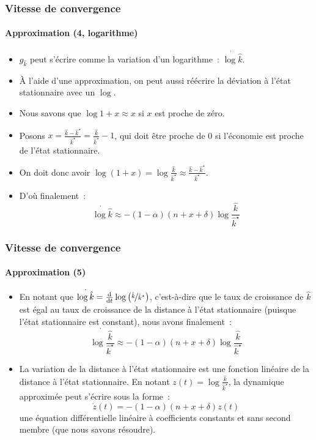 \documentclass[10pt,notheorems]{beamer}
\theoremstyle{plain}
\theoremstyle{definition} %
\begin{document}
\begin{frame}
  \frametitle{Vitesse de convergence}
  \framesubtitle{Approximation (4, logarithme)}

  \begin{itemize}

  \item $g_{\hat k}$ peut s'écrire comme la variation d'un logarithme~: $\dot{\log\hat k}$.\newline

  \item À l'aide d'une approximation, on peut aussi réécrire la déviation à l'état stationnaire avec un $\log$.\newline

  \item Nous savons que $\log 1+x \approx x$ si $x$ est proche de zéro.\newline

  \item Posons $x = \frac{\hat k - \hat k^{\star}}{\hat k^{\star}} = \frac{\hat k }{\hat k^{\star}}-1$, qui doit être proche de 0 si l'économie est proche de l'état stationnaire.\newline

  \item On doit donc avoir $\log(1+x) = \log \frac{\hat k }{\hat k^{\star}} \approx \frac{\hat k - \hat k^{\star}}{\hat k^\star}$.\newline

  \item D'où finalement~:
    \[
      \dot{\log\hat k} \approx -(1-\alpha)(n+x+\delta)\log\frac{\hat k }{\hat k^{\star}}
    \]

  \end{itemize}

\end{frame}


\begin{frame}
  \frametitle{Vitesse de convergence}
  \framesubtitle{Approximation (5)}

  \begin{itemize}

  \item En notant que $\dot{\log\hat k} = \frac{\mathrm d}{\mathrm dt}\log\left(\nicefrac{\hat k }{\hat k^{\star}}\right)$, c'est-à-dire que le taux de croissance de $\hat k$ est égal au taux de croissance de la distance à l'état stationnaire (puisque l'état stationnaire est constant), nous avons finalement~:
    \[
      \dot{\log\frac{\hat k }{\hat k^{\star}}} \approx -(1-\alpha)(n+x+\delta)\log\frac{\hat k }{\hat k^{\star}}
    \]

  \item La variation de la distance à l'état stationnaire est une fonction linéaire de la distance à l'état stationnaire. En notant $z(t) = \log\frac{\hat k }{\hat k^{\star}}$, la dynamique approximée peut s'écrire sous la forme~:
    \[
      \dot z(t) = -(1-\alpha)(n+x+\delta)z(t)
    \]
    une équation différentielle linéaire à coefficients constants et sans second membre (que nous savons résoudre).
  \end{itemize}

\end{frame}
\end{document}

